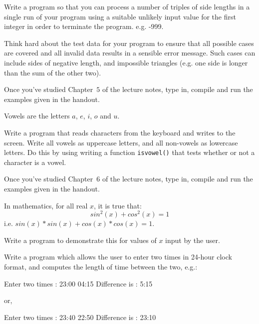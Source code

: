 \begin{exercise}
Write a program so that you can process a number of triples of side lengths
in a single run of your program using a suitable
unlikely input value for the first integer in order to terminate
the program. e.g. -999.

Think hard about the test data for your program to ensure that
all possible cases are covered and all invalid data results in
a sensible error message. Such cases can include sides of negative length,
and impossible triangles (e.g. one side is longer than the sum of the other two).
\end{exercise}

\begin{exercise}
Once you've studied Chapter~$5$ of the lecture notes, type in, compile and run
the examples given in the handout.
\end{exercise}

Vowels are the letters $a$, $e$, $i$, $o$ and $u$.
\begin{exercise}
Write a program that reads characters from the keyboard and writes to the
screen. Write all vowels as uppercase letters, and all non-vowels as
lowercase letters. Do this by using writing a function \verb^isvowel()^
that tests whether or not a character is a vowel.
\end{exercise}

\begin{exercise}
Once you've studied Chapter~$6$ of the lecture notes, type in,
compile and run the examples given in the handout.
\end{exercise}

In mathematics, for all real $x$, it is true that:
\[
sin^2(x) + cos^2(x) = 1
\]
i.e. $sin(x)*sin(x) + cos(x)*cos(x) = 1$.\\

\begin{exercise}
Write a program to demonstrate this for values of $x$ input by the user.
\end{exercise}

\begin{exercise}
Write a program which allows the user to enter two times in
24-hour clock format, and computes the length of time between the
two, e.g.:
\begin{terminaloutput}
Enter two times : 23:00 04:15
Difference is : 5:15
\end{terminaloutput}
or,
\begin{terminaloutput}
Enter two times : 23:40 22:50
Difference is : 23:10
\end{terminaloutput}
\end{exercise}

